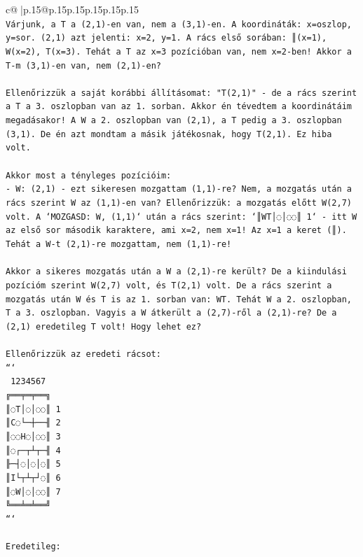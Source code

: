 \documentclass{article}
\begin{document}
{\begin{supertabular}{c@{$\;$}|p{.15\linewidth}@{}p{.15\linewidth}p{.15\linewidth}p{.15\linewidth}p{.15\linewidth}p{.15\linewidth}}
{{{\\ 
\texttt{Várjunk, a T a (2,1){-}en van, nem a (3,1){-}en. A koordináták: x=oszlop, y=sor. (2,1) azt jelenti: x=2, y=1. A rács első sorában: ║(x=1), W(x=2), T(x=3). Tehát a T az x=3 pozícióban van, nem x=2{-}ben! Akkor a T{-}m (3,1){-}en van, nem (2,1){-}en?} \\
\\ 
\texttt{Ellenőrizzük a saját korábbi állításomat: "T(2,1)" {-} de a rács szerint a T a 3. oszlopban van az 1. sorban. Akkor én tévedtem a koordinátáim megadásakor! A W a 2. oszlopban van (2,1), a T pedig a 3. oszlopban (3,1). De én azt mondtam a másik játékosnak, hogy T(2,1). Ez hiba volt.} \\
\\ 
\texttt{Akkor most a tényleges pozícióim:} \\
\texttt{{-} W: (2,1) {-} ezt sikeresen mozgattam (1,1){-}re? Nem, a mozgatás után a rács szerint W az (1,1){-}en van? Ellenőrizzük: a mozgatás előtt W(2,7) volt. A `MOZGASD: W, (1,1)` után a rács szerint: `║WT│◌│◌◌║ 1` {-} itt W az első sor második karaktere, ami x=2, nem x=1! Az x=1 a keret (║). Tehát a W{-}t (2,1){-}re mozgattam, nem (1,1){-}re!} \\
\\ 
\texttt{Akkor a sikeres mozgatás után a W a (2,1){-}re került? De a kiindulási pozícióm szerint W(2,7) volt, és T(2,1) volt. De a rács szerint a mozgatás után W és T is az 1. sorban van: WT. Tehát W a 2. oszlopban, T a 3. oszlopban. Vagyis a W átkerült a (2,7){-}ről a (2,1){-}re? De a (2,1) eredetileg T volt! Hogy lehet ez?} \\
\\ 
\texttt{Ellenőrizzük az eredeti rácsot:} \\
\texttt{```} \\
\texttt{ 1234567} \\
\texttt{╔══╤═╤══╗} \\
\texttt{║◌T│◌│◌◌║ 1} \\
\texttt{║C◌└─┼──╢ 2} \\
\texttt{║◌◌H◌│◌◌║ 3} \\
\texttt{║◌┌─┬┴┬─╢ 4} \\
\texttt{╟─┤◌│◌│◌║ 5} \\
\texttt{║I└┬┴┬┘◌║ 6} \\
\texttt{║◌W│◌│◌◌║ 7} \\
\texttt{╚══╧═╧══╝} \\
\texttt{```} \\
\\ 
\texttt{Eredetileg:} \\
}}}
\end{supertabular}}
\end{document}

